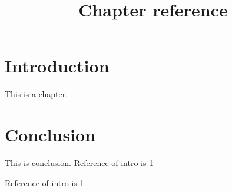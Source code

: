 \documentclass[a4paper,11pt,oneside,openany,report]{jsbook}
\title{Chapter reference}
\begin{document}
\maketitle
\chapter{Introduction}\label{ch:Introduction}
This is a chapter.

\chapter{Conclusion}\label{ch:Conclusion}
This is conclusion.
Reference of intro is
\ref{ch:Introduction}

Reference of intro is \ref{ch:Introduction}.
\end{document}
